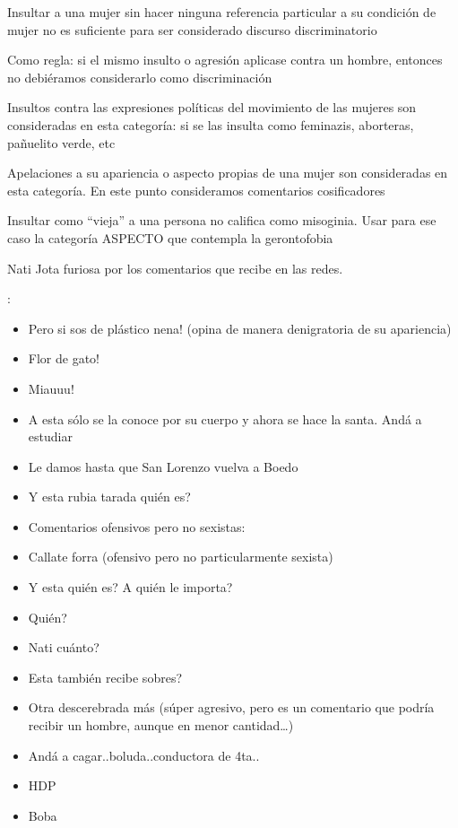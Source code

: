 Insultar a una mujer sin hacer ninguna referencia particular a su condición de mujer no es suficiente para ser considerado discurso discriminatorio

Como regla: si el mismo insulto o agresión aplicase contra un hombre, entonces no debiéramos considerarlo como discriminación

Insultos contra las expresiones políticas del movimiento de las mujeres son consideradas en esta categoría: si se las insulta como feminazis, aborteras, pañuelito verde, etc

Apelaciones a su apariencia o aspecto propias de una mujer son consideradas en esta categoría. En este punto consideramos comentarios cosificadores

Insultar como ``vieja'' a una persona no califica como misoginia. Usar para ese caso la categoría ASPECTO que contempla la gerontofobia


\begin{displayquote}
     Nati Jota furiosa por los comentarios que recibe en las redes.

    :
    \begin{itemize}
        \item Pero si sos de plástico nena! (opina de manera denigratoria de su apariencia)
        \item Flor de gato!
        \item Miauuu!
        \item A esta sólo se la conoce por su cuerpo y ahora se hace la santa. Andá a estudiar
        \item Le damos hasta que San Lorenzo vuelva a Boedo
        \item Y esta rubia tarada quién es?
    \end{itemize}


    \begin{itemize}
        \item Comentarios ofensivos pero no sexistas:
        \item Callate forra (ofensivo pero no particularmente sexista)
        \item Y esta quién es? A quién le importa?
        \item Quién?
        \item Nati cuánto?
        \item Esta también recibe sobres?
        \item Otra descerebrada más (súper agresivo, pero es un comentario que podría recibir un hombre, aunque en menor cantidad…)
        \item Andá a cagar..boluda..conductora de 4ta..
        \item HDP
        \item Boba
    \end{itemize}
\end{displayquote}


